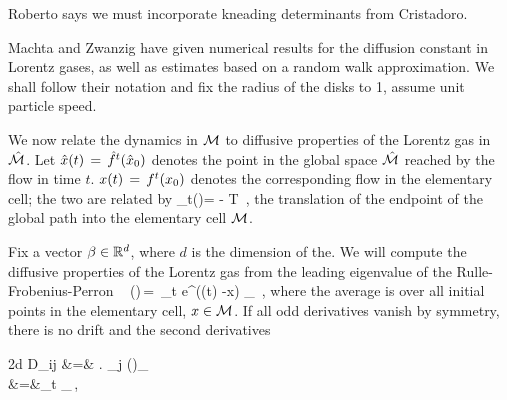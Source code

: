     { Roberto says we must
incorporate kneading determinants from
Cristadoro.
    }



Machta and Zwanzig have given numerical results
for the diffusion constant in Lorentz gases,  as well as
estimates based on a random walk approximation. We shall follow
their notation and fix the radius of the disks to 1,
assume unit particle speed.

We now relate the dynamics in ${\cal M}$ to diffusive properties of the
Lorentz gas in $\hat {{\cal M}}$. Let $\hat x(t)\,=\,{\hat{f}^{t}(\hat x_0)}$ denotes the point
in the global space $\hat {{\cal M}}$ reached by the flow in time $t$.
$x(t)\,=\,{f^{t}({x_0})}$ denotes the corresponding flow in the
elementary cell; the two are related by
\beq
\hn_t(\xInit)= -  \in T \,,
the translation of the endpoint of the global path into the elementary cell $\pS$.

Fix a vector $\beta \in \reals^d$, where $d$ is the dimension of
the{\statesp}. We will compute the diffusive properties of the Lorentz
gas from the leading eigenvalue of the Rulle-Frobenius-Perron \evOper\
\beq
\eigenvL(\beta)\,=\, \lim_{t \rightarrow \infty}  \log \langle
e^{\beta \cdot (\hx(t) -x) } \rangle_\pS ~, \quad
\label{eq-diff-1}
\eeq
where the average is over all initial points in the elementary cell, $x
\in{\cal M}$. If all odd derivatives vanish by symmetry, there is no drift and
the second derivatives

\bea
2d D_{ij} &=& \left . {} {\frac{\partial}
{\partial \beta_j}} \eigenvL(\beta)\right\vert_{\beta=0}\\\nonumber
&=&\lim_{t\rightarrow
\infty} {}  \rangle_\pS \,,
\eea

